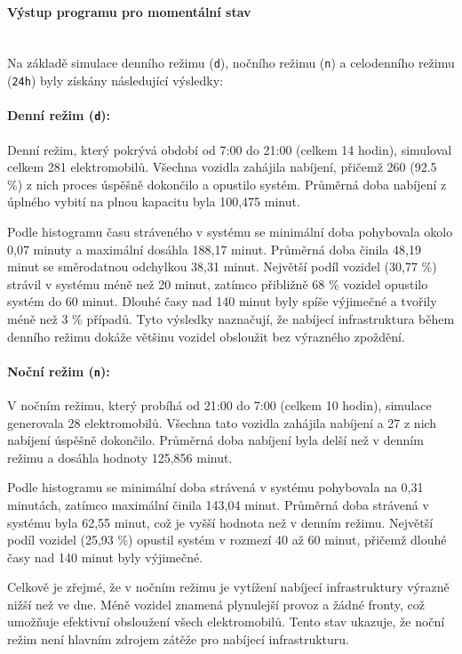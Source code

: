 \documentclass[a4paper,11pt]{article}
\begin{document}
\paragraph{Výstup programu pro momentální stav\\\\}

Na základě simulace denního režimu (\texttt{d}), nočního režimu (\texttt{n}) a celodenního režimu (\texttt{24h}) byly získány následující výsledky:

\paragraph{Denní režim (\texttt{d}):} 
Denní režim, který pokrývá období od 7:00 do 21:00 (celkem 14 hodin), simuloval celkem 281 elektromobilů. Všechna vozidla zahájila nabíjení, přičemž 260 (92.5 \%) z nich proces úspěšně dokončilo a opustilo systém. Průměrná doba nabíjení z úplného vybití na plnou kapacitu byla 100,475 minut.

Podle histogramu času stráveného v systému se minimální doba pohybovala okolo 0,07 minuty a maximální dosáhla 188,17 minut. Průměrná doba činila 48,19 minut se směrodatnou odchylkou 38,31 minut. Největší podíl vozidel (30,77 \%) strávil v systému méně než 20 minut, zatímco přibližně 68 \% vozidel opustilo systém do 60 minut. Dlouhé časy nad 140 minut byly spíše výjimečné a tvořily méně než 3 \% případů. Tyto výsledky naznačují, že nabíjecí infrastruktura během denního režimu dokáže většinu vozidel obsloužit bez výrazného zpoždění.

\paragraph{Noční režim (\texttt{n}):}
V nočním režimu, který probíhá od 21:00 do 7:00 (celkem 10 hodin), simulace generovala 28 elektromobilů. Všechna tato vozidla zahájila nabíjení a 27 z nich nabíjení úspěšně dokončilo. Průměrná doba nabíjení byla delší než v denním režimu a dosáhla hodnoty 125,856 minut.

Podle histogramu se minimální doba strávená v systému pohybovala na 0,31 minutách, zatímco maximální činila 143,04 minut. Průměrná doba strávená v systému byla 62,55 minut, což je vyšší hodnota než v denním režimu. Největší podíl vozidel (25,93 \%) opustil systém v rozmezí 40 až 60 minut, přičemž dlouhé časy nad 140 minut byly výjimečné.

Celkově je zřejmé, že v nočním režimu je vytížení nabíjecí infrastruktury výrazně nižší než ve dne. Méně vozidel znamená plynulejší provoz a žádné fronty, což umožňuje efektivní obsloužení všech elektromobilů. Tento stav ukazuje, že noční režim není hlavním zdrojem zátěže pro nabíjecí infrastrukturu.
\end{document}
